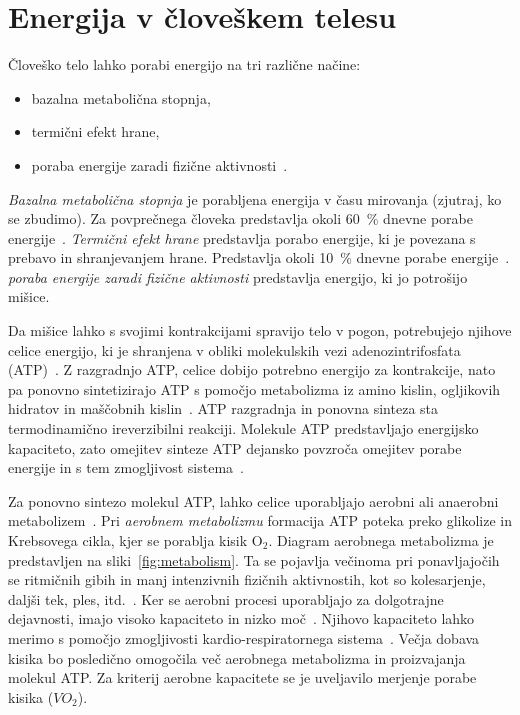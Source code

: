 \section{Energija v človeškem telesu}\label{sec:energija}
Človeško telo lahko porabi energijo na tri različne načine:

\begin{itemize}
\item bazalna metabolična stopnja,
\item termični efekt hrane,
\item poraba energije zaradi fizične aktivnosti~\cite{levine2005measurement}.
\end{itemize}

\emph{Bazalna metabolična stopnja} je porabljena energija v času mirovanja (zjutraj, ko se zbudimo). Za povprečnega človeka predstavlja okoli \SI{60}{\%} dnevne porabe energije~\cite{levine2005measurement}. \emph{Termični efekt hrane} predstavlja porabo energije, ki je povezana s prebavo in shranjevanjem hrane. Predstavlja okoli \SI{10}{\%} dnevne porabe energije~\cite{levine2005measurement}. \emph{poraba energije zaradi fizične aktivnosti} predstavlja energijo, ki jo potrošijo mišice. 

Da mišice lahko s svojimi kontrakcijami spravijo telo v pogon, potrebujejo njihove celice energijo, ki je shranjena v obliki molekulskih vezi adenozintrifosfata (ATP)~\cite{scott2005misconceptions}. Z razgradnjo ATP, celice dobijo potrebno energijo za kontrakcije, nato pa ponovno sintetizirajo ATP s pomočjo metabolizma iz amino kislin, ogljikovih hidratov in maščobnih kislin~\cite{scott2005misconceptions,patel2017aerobic}. ATP razgradnja in ponovna sinteza sta termodinamično ireverzibilni reakciji. Molekule ATP predstavljajo energijsko kapaciteto, zato omejitev sinteze ATP dejansko povzroča omejitev porabe energije in s tem zmogljivost sistema~\cite{sahlin1998energy}.

Za ponovno sintezo molekul ATP, lahko celice uporabljajo aerobni ali anaerobni metabolizem~\cite{scott2005misconceptions}. Pri \emph{aerobnem metabolizmu} formacija ATP poteka preko glikolize in Krebsovega cikla, kjer se porablja kisik $\mathrm{O}_2$. Diagram aerobnega metabolizma je predstavljen na sliki~\ref{fig:metabolism}. Ta se pojavlja večinoma pri ponavljajočih se ritmičnih gibih in manj intenzivnih fizičnih aktivnostih, kot so kolesarjenje, daljši tek, ples, itd.~\cite{patel2017aerobic}. Ker se aerobni procesi uporabljajo za dolgotrajne dejavnosti, imajo visoko kapaciteto in nizko moč~\cite{sahlin1998energy}. Njihovo kapaciteto lahko merimo s pomočjo zmogljivosti kardio-respiratornega sistema~\cite{patel2017aerobic}. Večja dobava kisika bo posledično omogočila več aerobnega metabolizma in proizvajanja molekul ATP. Za kriterij aerobne kapacitete se je uveljavilo merjenje porabe kisika (${VO}_2$).

